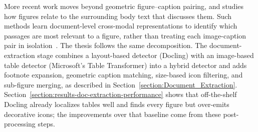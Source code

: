More recent work moves beyond geometric figure--caption pairing, and studies how figures relate to the surrounding body text that discusses them. Such methods learn document-level cross-modal representations to identify which passages are most relevant to a figure, rather than treating each image-caption pair in isolation~\parencite{liu2024documentcliplinkingfigures}. The thesis follows the same decomposition. The document-extraction stage combines a layout-based detector (Docling) with an image-based table detector (Microsoft's Table Transformer) into a hybrid detector and adds footnote expansion, geometric caption matching, size-based icon filtering, and sub-figure merging, as described in Section~\ref{section:Document_Extraction}. Section~\ref{section:results-doc-extraction-performance} shows that off-the-shelf Docling already localizes tables well and finds every figure but over-emits decorative icons; the improvements over that baseline come from these post-processing steps.